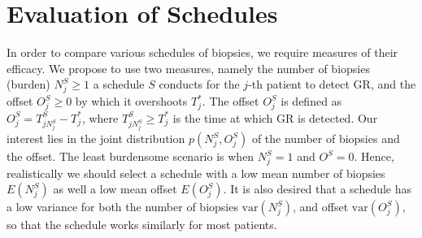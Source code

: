 
\section{Evaluation of Schedules}
\label{sec : choosing_schedule}
In order to compare various schedules of biopsies, we require measures of their efficacy. We propose to use two measures, namely the number of biopsies (burden) $N^S_j \geq 1$ a schedule $S$ conducts for the $j$-th patient to detect GR, and the offset $O^S_j \geq 0$ by which it overshoots $T^*_j$. The offset $O^S_j$ is defined as $O^S_j = T^S_{j{N^S_j}} - T^*_j$, where $T^S_{j{N^S_j}} \geq T^*_j$ is the time at which GR is detected. Our interest lies in the joint distribution $p(N^S_j, O^S_j)$ of the number of biopsies and the offset. The least burdensome scenario is when $N^S_j=1$ and $O^S=0$. Hence, realistically we should select a schedule with a low mean number of biopsies $E(N^S_j)$ as well a low mean offset $E(O^S_j)$. It is also desired that a schedule has a low variance for both the number of biopsies $\mbox{var}(N^S_j)$, and offset $\mbox{var}(O^S_j)$, so that the schedule works similarly for most patients. 

